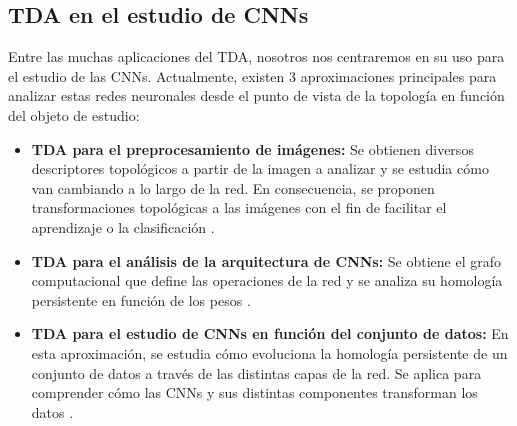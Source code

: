 \subsection{TDA en el estudio de CNNs}

Entre las muchas aplicaciones del TDA, nosotros nos centraremos en su uso para el estudio de las CNNs. Actualmente, existen 3 aproximaciones principales para analizar estas redes neuronales desde el punto de vista de la topología en función del objeto de estudio:

\begin{itemize}
	\item \textbf{TDA para el preprocesamiento de imágenes:} Se obtienen diversos descriptores topológicos a partir de la imagen a analizar y se estudia cómo van cambiando a lo largo de la red. En consecuencia, se proponen transformaciones topológicas a las imágenes con el fin de facilitar el aprendizaje o la clasificación \cite{garin2019topological}.
	
	\item \textbf{TDA para el análisis de la arquitectura de CNNs:} Se obtiene el grafo computacional que define las operaciones de la red y se analiza su homología persistente en función de los pesos \cite{chowdhury2018persistent}.
	
	\item \textbf{TDA para el estudio de CNNs en función del conjunto de datos:} En esta aproximación, se estudia cómo evoluciona la homología persistente de un conjunto de datos a través de las distintas capas de la red. Se aplica para comprender cómo las CNNs y sus distintas componentes transforman los datos \cite{naitzat2020topology}.  
\end{itemize}

